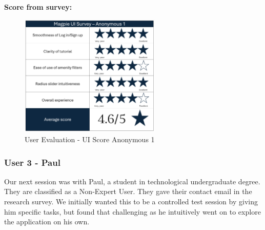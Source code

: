 \noindent\textbf{Score from survey: }
\begin{figure}[h!]
    \centering
    \includegraphics[width=0.6\textwidth]{images/survey-maira.png}
    \caption{User Evaluation - UI Score Anonymous 1}
\end{figure}

\newpage
\subsubsection{User 3 - Paul}
Our next session was with Paul, a student in technological undergraduate degree.
They are classified as a Non-Expert User. They gave their contact email in the
research survey. We initially wanted this to be a controlled test session by
giving him specific tasks, but found that challenging as he intuitively went on
to explore the application on his own.

